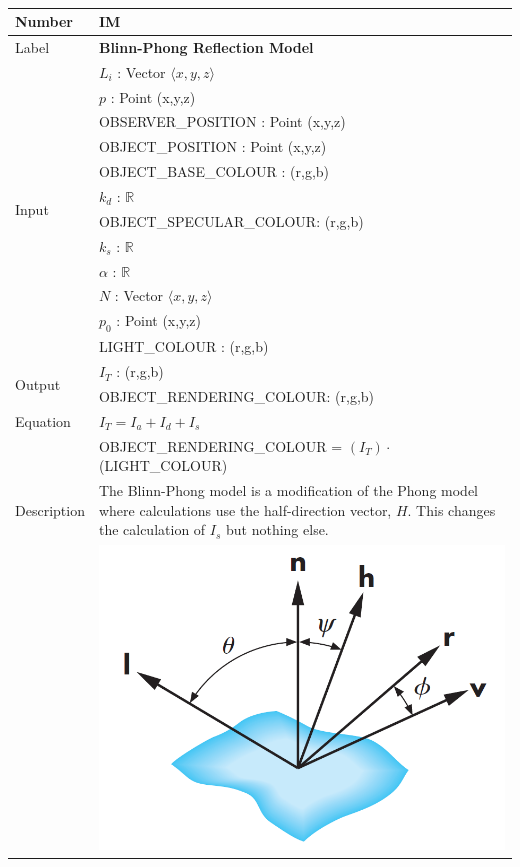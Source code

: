 \documentclass[12pt]{article}
\newcommand{\colAwidth}{0.13\textwidth}
\newcommand{\colBwidth}{0.82\textwidth}
\newcounter{instnum} %
\begin{document}
~\newline

\noindent
\begin{minipage}{\textwidth}
	\renewcommand*{\arraystretch}{1.5}
	\begin{tabular}{| p{\colAwidth} | p{\colBwidth}|}
		\hline
		\rowcolor[gray]{0.9}
		Number& IM{instnum}\theinstnum \label{IM_Blinn_Phong}\\
		\hline
		Label& \bf Blinn-Phong Reflection Model\\
		\hline
		\multirow{12}{*}{Input} & $L_{i}$ : Vector $\langle x, y ,z \rangle$\\
		& $p$ : Point (x,y,z)\\
		& OBSERVER\_POSITION : Point (x,y,z)\\		
		& OBJECT\_POSITION : Point (x,y,z)\\
		& OBJECT\_BASE\_COLOUR : (r,g,b)\\
		& $k_{d}$ : $\mathbb{R}$\\
		& OBJECT\_SPECULAR\_COLOUR: (r,g,b)\\
		& $k_{s}$ : $\mathbb{R}$ \\
		& $\alpha$ : $\mathbb{R}$ \\
		& $N$ : Vector $\langle x, y ,z \rangle$\\
		& $p_{0}$ : Point (x,y,z)\\		
		& LIGHT\_COLOUR : (r,g,b)\\	
		\hline
		\multirow{2}{*}{Output} & $I_{T}$ : (r,g,b)\\
		& OBJECT\_RENDERING\_COLOUR: (r,g,b)\\
		\hline
		Equation & $I_{T} = I_{a} + I_{d} + I_{s}$\\
		& OBJECT\_RENDERING\_COLOUR = $(I_{T})\cdot$(LIGHT\_COLOUR)\\
		Description& The Blinn-Phong model is a modification of the Phong model 
		where calculations use the half-direction vector, $H$. This changes the 
		calculation of $I_{s}$ but nothing else.\\
		&\includegraphics[scale=0.4]{./images/blinn-phong-reflection-model-vectors}\\
		\hline
	\end{tabular}
\end{minipage}\\
\end{document}
